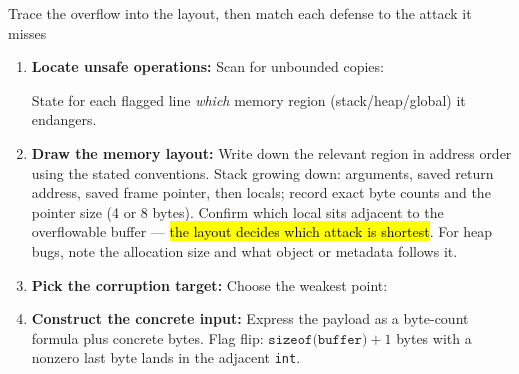 \documentclass[12pt, a4paper]{article}
\newcommand{\imp}[1]{\hl{#1}}                       %
\begin{document}
\begin{schemebox}{Trace the overflow into the layout, then match each defense to the attack it misses}
\begin{enumerate}[label=\textbf{Step \arabic*:}, leftmargin=*]
    \item \textbf{Locate unsafe operations:} Scan for unbounded copies:
    State for each flagged line \emph{which} memory region (stack/heap/global) it endangers.
    \item \textbf{Draw the memory layout:} Write down the relevant region in address order using the stated conventions. Stack growing down: arguments, saved return address, saved frame pointer, then locals; record exact byte counts and the pointer size (4 or 8 bytes).
    Confirm which local sits adjacent to the overflowable buffer --- \imp{the layout decides which attack is shortest}. For heap bugs, note the allocation size and what object or metadata follows it.
    \item \textbf{Pick the corruption target:} Choose the weakest point:
    \item \textbf{Construct the concrete input:} Express the payload as a byte-count formula plus concrete bytes. Flag flip: $\texttt{sizeof(buffer)} + 1$ bytes with a nonzero last byte lands in the adjacent \texttt{int}.

\end{enumerate}
\end{schemebox}
\end{document}
